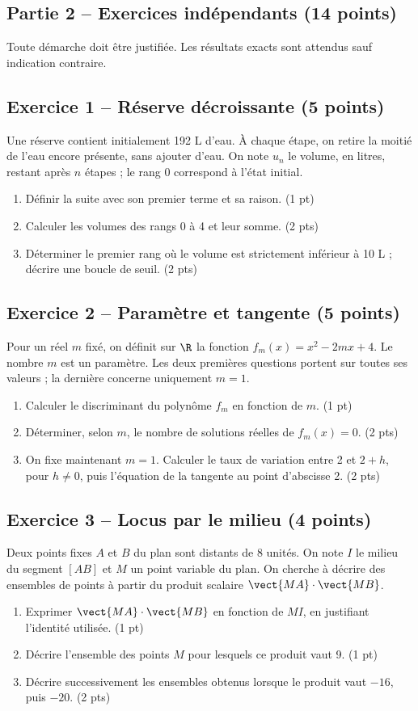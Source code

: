 \mxnewpage\subsection*{Partie 2 -- Exercices indépendants (14 points)}
Toute démarche doit être justifiée. Les résultats exacts sont attendus sauf indication contraire.
\subsection*{Exercice 1 -- Réserve décroissante (5 points)}
Une réserve contient initialement 192 L d’eau. À chaque étape, on retire la moitié de l’eau encore présente, sans ajouter d’eau. On note $u_n$ le volume, en litres, restant après $n$ étapes ; le rang 0 correspond à l’état initial.
\begin{enumerate}
\item Définir la suite avec son premier terme et sa raison. \hfill(1 pt)
\item Calculer les volumes des rangs 0 à 4 et leur somme. \hfill(2 pts)
\item Déterminer le premier rang où le volume est strictement inférieur à 10 L ; décrire une boucle de seuil. \hfill(2 pts)
\end{enumerate}
\subsection*{Exercice 2 -- Paramètre et tangente (5 points)}
Pour un réel $m$ fixé, on définit sur $\R$ la fonction $f_m(x)=x^2-2mx+4$. Le nombre $m$ est un paramètre. Les deux premières questions portent sur toutes ses valeurs ; la dernière concerne uniquement $m=1$.
\begin{enumerate}
\item Calculer le discriminant du polynôme $f_m$ en fonction de $m$. \hfill(1 pt)
\item Déterminer, selon $m$, le nombre de solutions réelles de $f_m(x)=0$. \hfill(2 pts)
\item On fixe maintenant $m=1$. Calculer le taux de variation entre 2 et $2+h$, pour $h\ne0$, puis l’équation de la tangente au point d’abscisse 2. \hfill(2 pts)
\end{enumerate}
\subsection*{Exercice 3 -- Locus par le milieu (4 points)}
Deux points fixes $A$ et $B$ du plan sont distants de 8 unités. On note $I$ le milieu du segment $[AB]$ et $M$ un point variable du plan. On cherche à décrire des ensembles de points à partir du produit scalaire $\vect{MA}\cdot\vect{MB}$.
\begin{enumerate}
\item Exprimer $\vect{MA}\cdot\vect{MB}$ en fonction de $MI$, en justifiant l’identité utilisée. \hfill(1 pt)
\item Décrire l’ensemble des points $M$ pour lesquels ce produit vaut 9. \hfill(1 pt)
\item Décrire successivement les ensembles obtenus lorsque le produit vaut $-16$, puis $-20$. \hfill(2 pts)
\end{enumerate}
